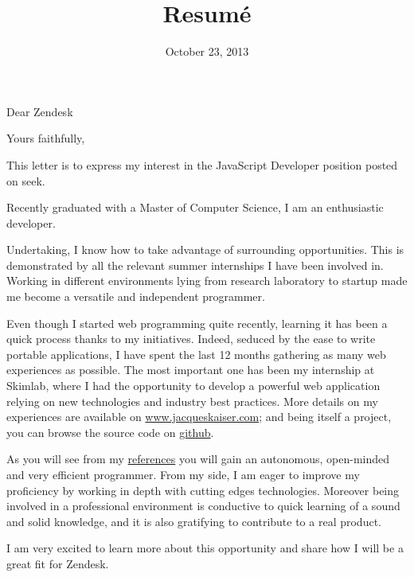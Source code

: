 \documentclass[11pt,a4paper,sans]{moderncv}        %
\title{Resumé}                               %
\begin{document}
\date{October 23, 2013}
\opening{Dear Zendesk}
\closing{Yours faithfully,}

\makelettertitle

This letter is to express my interest in the JavaScript Developer position posted on seek.

Recently graduated with a Master of Computer Science, I am an enthusiastic developer.

Undertaking, I know how to take advantage of surrounding opportunities.
This is demonstrated by all the relevant summer internships I have been involved in.
Working in different environments lying from research laboratory to startup made me become a versatile and independent programmer.

Even though I started web programming quite recently, learning it has been a quick process thanks to my initiatives.
Indeed, seduced by the ease to write portable applications, I have spent the last 12 months gathering as many web experiences as possible.
The most important one has been my internship at Skimlab, where I had the opportunity to develop a powerful web application
relying on new technologies and industry best practices.
More details on my experiences are available on \href{http://www.jacqueskaiser.com}{www.jacqueskaiser.com}; and being itself a project, you can browse the source code on \href{https://www.github.com/jackokaiser/chezjacking}{github}.

As you will see from my \href{http://www.linkedin.com/profile/view?id=97265989&locale=en_US}{references}
you will gain an autonomous, open-minded and very efficient programmer.
From my side, I am eager to improve my proficiency by working in depth with cutting edges technologies.
Moreover being involved in a professional environment is conductive to quick learning of a sound and solid knowledge,
and it is also gratifying to contribute to a real product.

I am very excited to learn more about this opportunity and share how I will be a great fit for Zendesk.

\makeletterclosing
\end{document}
